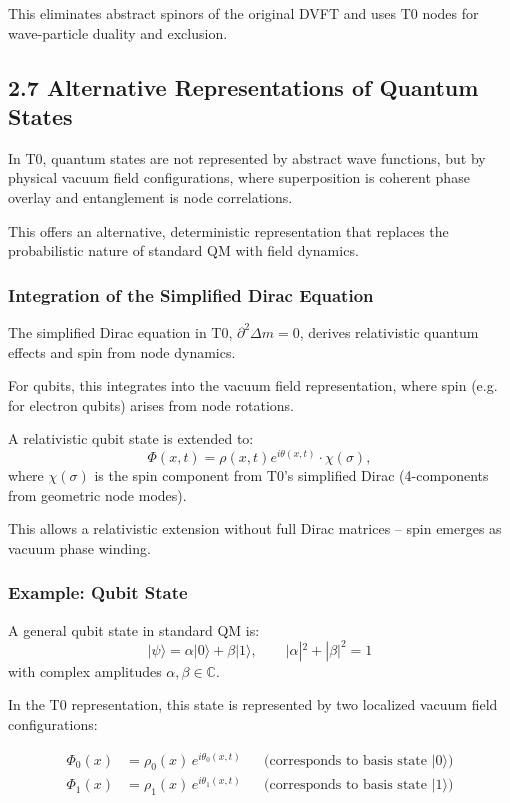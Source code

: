 \documentclass[12pt,a4paper]{article}
\begin{document}
	This eliminates abstract spinors of the original DVFT and uses T0 nodes for wave-particle duality and exclusion.
	
	\subsection{2.7 Alternative Representations of Quantum States}
	
	In T0, quantum states are not represented by abstract wave functions, but by physical vacuum field configurations, where superposition is coherent phase overlay and entanglement is node correlations.
	
	This offers an alternative, deterministic representation that replaces the probabilistic nature of standard QM with field dynamics.
	
	\subsubsection{Integration of the Simplified Dirac Equation}
	
	The simplified Dirac equation in T0, $\partial^2 \Delta m = 0$, derives relativistic quantum effects and spin from node dynamics.
	
	For qubits, this integrates into the vacuum field representation, where spin (e.g. for electron qubits) arises from node rotations.
	
	A relativistic qubit state is extended to:
	\[
	\Phi(x,t) = \rho(x,t) e^{i \theta(x,t)} \cdot \chi(\sigma),
	\]
	where $\chi(\sigma)$ is the spin component from T0's simplified Dirac (4-components from geometric node modes).
	
	This allows a relativistic extension without full Dirac matrices – spin emerges as vacuum phase winding.
	
	\subsubsection{Example: Qubit State}
	
	A general qubit state in standard QM is:
	\[
	|\psi\rangle = \alpha |0\rangle + \beta |1\rangle, \qquad |\alpha|^2 + |\beta|^2 = 1
	\]
	with complex amplitudes $\alpha, \beta \in \mathbb{C}$.
	
	In the T0 representation, this state is represented by two localized vacuum field configurations:
	
	\begin{align}
		\Phi_0(x) &= \rho_0(x) \, e^{i \theta_0(x,t)} && \text{(corresponds to basis state } |0\rangle\text{)} \\
		\Phi_1(x) &= \rho_1(x) \, e^{i \theta_1(x,t)} && \text{(corresponds to basis state } |1\rangle\text{)}
	\end{align}
	
\end{document}
